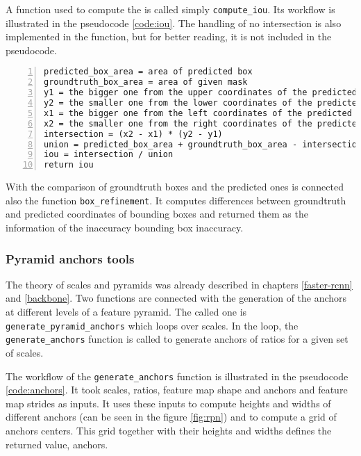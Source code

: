 A function used to compute the  is called simply \verb|compute_iou|. Its workflow is illustrated in the pseudocode \ref{code:iou}. The handling of no intersection is also implemented in the function, but for better reading, it is not included in the pseudocode.

{\scriptsize
\begin{lstlisting}[style=python, caption={compute\_iou}, captionpos=b, label=code:iou, deletekeywords={from, and},
backgroundcolor = \color{light-gray}, numbers=left, breaklines=true]
predicted_box_area = area of predicted box
groundtruth_box_area = area of given mask
y1 = the bigger one from the upper coordinates of the predicted and groundtruth bboxes
y2 = the smaller one from the lower coordinates of the predicted and groundtruth bboxes
x1 = the bigger one from the left coordinates of the predicted and groundtruth bboxes
x2 = the smaller one from the right coordinates of the predicted and groundtruth bboxes
intersection = (x2 - x1) * (y2 - y1)
union = predicted_box_area + groundtruth_box_area - intersection
iou = intersection / union
return iou
\end{lstlisting}}

With the comparison of groundtruth boxes and the predicted ones is connected also the function \verb|box_refinement|. It computes differences between groundtruth and predicted coordinates of bounding boxes and returned them as the information of the inaccuracy bounding box inaccuracy.


\subsubsection{Pyramid anchors tools}
\label{anchors-func}

The theory of scales and pyramids was already described in chapters \ref{faster-rcnn} and \ref{backbone}. Two functions are connected with the generation of the anchors at different levels of a feature pyramid. The called one is \verb|generate_pyramid_anchors| which loops over scales. In the loop, the \verb|generate_anchors| function is called to generate anchors of ratios for a given set of scales. 

The workflow of the \verb|generate_anchors| function is illustrated in the pseudocode \ref{code:anchors}. It took scales, ratios, feature map shape and anchors and feature map strides as inputs. It uses these inputs to compute heights and widths of different anchors (can be seen in the figure \ref{fig:rpn}) and to compute a grid of anchors centers. This grid together with their heights and widths defines the returned value, anchors.

